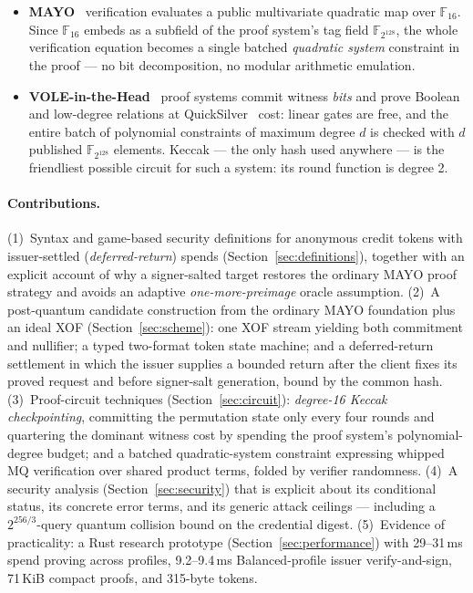 \documentclass[11pt]{article}
\newcommand{\F}{\mathbb{F}}
\newcommand{\Fsixteen}{\F_{16}}
\newcommand{\Ftag}{\F_{2^{128}}}
\begin{document}
\begin{itemize}
  \item \textbf{MAYO}~\cite{Beullens21,MAYOspec} verification evaluates a
  public multivariate quadratic map over $\Fsixteen$. Since
  $\Fsixteen$ embeds as a subfield of the proof system's tag field
  $\Ftag$, the whole verification equation becomes a single batched
  \emph{quadratic system} constraint in the proof --- no bit decomposition,
  no modular arithmetic emulation.
  \item \textbf{VOLE-in-the-Head}~\cite{VOLEitH,FAEST} proof systems commit
  witness \emph{bits} and prove Boolean and low-degree relations at
  QuickSilver~\cite{QuickSilver,Wolverine} cost: linear gates are free, and
  the entire batch of polynomial constraints of maximum degree $d$ is checked
  with $d$ published $\Ftag$ elements. Keccak --- the only hash used
  anywhere --- is the friendliest possible circuit for such a system: its
  round function is degree 2.
\end{itemize}

\paragraph{Contributions.}
(1)~Syntax and game-based security definitions for anonymous credit tokens
with issuer-settled (\emph{deferred-return}) spends
(Section~\ref{sec:definitions}), together with an explicit account of why
a signer-salted target restores the ordinary MAYO proof strategy and avoids
an adaptive \emph{one-more-preimage} oracle assumption.
(2)~A post-quantum candidate construction from the ordinary MAYO foundation plus an ideal XOF
(Section~\ref{sec:scheme}): one XOF stream yielding both commitment and
nullifier; a typed two-format token state machine; and a deferred-return
settlement in which the issuer supplies a bounded return after the client fixes
its proved request and before signer-salt generation, bound by the common hash.
(3)~Proof-circuit techniques (Section~\ref{sec:circuit}): \emph{degree-16
Keccak checkpointing}, committing the permutation state only every four
rounds and quartering the dominant witness cost by spending the proof
system's polynomial-degree budget; and a batched quadratic-system constraint
expressing whipped MQ verification over shared product terms, folded by
verifier randomness.
(4)~A security analysis (Section~\ref{sec:security}) that is explicit about
its conditional status, its concrete error terms, and its generic attack
ceilings --- including a $2^{256/3}$-query quantum collision bound on the
credential digest.
(5)~Evidence of practicality: a Rust research prototype
(Section~\ref{sec:performance}) with 29--31\,ms spend proving across profiles,
9.2--9.4\,ms Balanced-profile issuer verify-and-sign, 71\,KiB compact proofs,
and 315-byte tokens.
\end{document}
